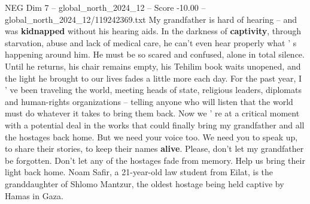 \begin{textsample}{NEG Dim 7 – global\_north\_2024\_12 – Score -10.00 – global\_north\_2024\_12/119242369.txt}
My grandfather is hard of hearing -- and was \textbf{kidnapped} without his hearing aids.
In the darkness of \textbf{captivity}, through starvation, abuse and lack of medical care, he can't even hear properly what ' s happening around him.
He must be so scared and confused, alone in total silence.
Until he returns, his chair remains empty, his Tehilim book waits unopened, and the light he brought to our lives fades a little more each day.
For the past year, I ' ve been traveling the world, meeting heads of state, religious leaders, diplomats and human-rights organizations -- telling anyone who will listen that the world must do whatever it takes to bring them back.
Now we ' re at a critical moment with a potential deal in the works that could finally bring my grandfather and all the hostages back home.
But we need your voice too.
We need you to speak up, to share their stories, to keep their names \textbf{alive}.
Please, don't let my grandfather be forgotten.
Don't let any of the hostages fade from memory.
Help us bring their light back home.
Noam Safir, a 21-year-old law student from Eilat, is the granddaughter of Shlomo Mantzur, the oldest hostage being held captive by Hamas in Gaza.

\end{textsample}
